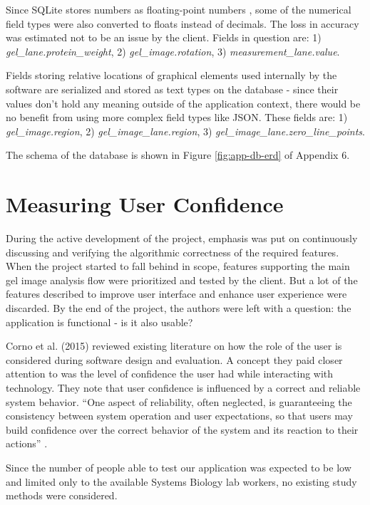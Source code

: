 Since SQLite stores numbers as floating-point numbers \cite{sqlite-numbers}, some of the numerical field types were also converted to floats instead of decimals. The loss in accuracy was estimated not to be an issue by the client. Fields in question are: 1) \emph{gel\_lane.protein\_weight}, 2) \emph{gel\_image.rotation}, 3) \emph{measurement\_lane.value}.

Fields storing relative locations of graphical elements used internally by the software are serialized and stored as text types on the database - since their values don't hold any meaning outside of the application context, there would be no benefit from using more complex field types like JSON. These fields are: 1) \emph{gel\_image.region}, 2) \emph{gel\_image\_lane.region}, 3) \emph{gel\_image\_lane.zero\_line\_points}.

The schema of the database is shown in Figure \ref{fig:app-db-erd} of Appendix 6.

\section{Measuring User Confidence}

During the active development of the project, emphasis was put on continuously discussing and verifying the algorithmic correctness of the required features. When the project started to fall behind in scope, features supporting the main gel image analysis flow were prioritized and tested by the client. But a lot of the features described to improve user interface and enhance user experience were discarded. By the end of the project, the authors were left with a question: the application is functional - is it also usable?

Corno et al. (2015) reviewed existing literature on how the role of the user is considered during software design and evaluation. A concept they paid closer attention to was the level of confidence the user had while interacting with technology. They note that user confidence is influenced by a correct and reliable system behavior. “One aspect of reliability, often neglected, is guaranteeing the consistency between system operation and user expectations, so that users may build confidence over the correct behavior of the system and its reaction to their actions” \cite{Corno2015}.

Since the number of people able to test our application was expected to be low and limited only to the available Systems Biology lab workers, no existing study methods were considered. 

